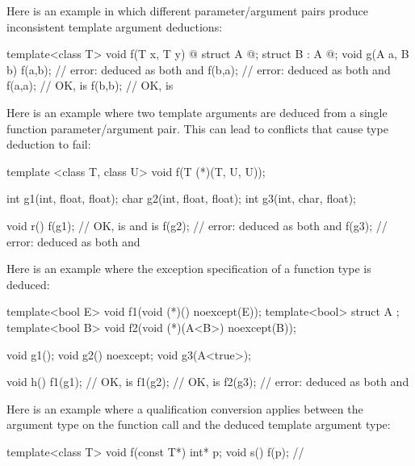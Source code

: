 \pnum
\begin{example}
Here is an example in which different parameter/argument pairs produce
inconsistent template argument deductions:

\begin{codeblock}
template<class T> void f(T x, T y) { @\commentellip@ }
struct A { @\commentellip@ };
struct B : A { @\commentellip@ };
void g(A a, B b) {
  f(a,b);           // error:  deduced as both  and 
  f(b,a);           // error:  deduced as both  and 
  f(a,a);           // OK,  is 
  f(b,b);           // OK,  is 
}
\end{codeblock}

Here is an example where two template arguments are deduced from a
single function parameter/argument pair.
This can lead to conflicts
that cause type deduction to fail:

\begin{codeblock}
template <class T, class U> void f(T (*)(T, U, U));

int g1(int, float, float);
char g2(int, float, float);
int g3(int, char, float);

void r() {
  f(g1);            // OK,  is  and  is 
  f(g2);            // error:  deduced as both  and 
  f(g3);            // error:  deduced as both  and 
}
\end{codeblock}

Here is an example where the exception specification of a function type
is deduced:

\begin{codeblock}
template<bool E> void f1(void (*)() noexcept(E));
template<bool> struct A { };
template<bool B> void f2(void (*)(A<B>) noexcept(B));

void g1();
void g2() noexcept;
void g3(A<true>);

void h() {
  f1(g1);           // OK,  is 
  f1(g2);           // OK,  is 
  f2(g3);           // error:  deduced as both  and 
}
\end{codeblock}

Here is an example where a qualification conversion applies between the
argument type on the function call and the deduced template argument type:

\begin{codeblock}
template<class T> void f(const T*) { }
int* p;
void s() {
  f(p);             // 
}
\end{codeblock}


\end{example}
